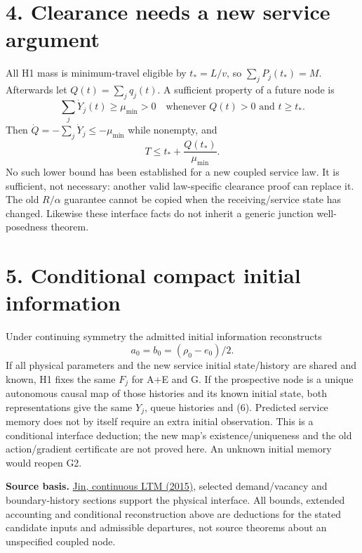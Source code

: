 \documentclass[11pt,a4paper]{article}
\begin{document}
\section*{4. Clearance needs a new service argument}

All H1 mass is minimum-travel eligible by $t_*=L/v$, so $\sum_jP_j(t_*)=M$.
Afterwards let $Q(t)=\sum_jq_j(t)$. A sufficient property of a future node is
\begin{equation}
 \sum_j\dot Y_j(t)\geq\mu_{\min}>0
 \quad\text{whenever }Q(t)>0\text{ and }t\geq t_*.
 \tag{7}
\end{equation}
Then $\dot Q=-\sum_j\dot Y_j\leq-\mu_{\min}$ while nonempty, and
\begin{equation}
 T\leq t_*+\frac{Q(t_*)}{\mu_{\min}}.
 \tag{8}
\end{equation}
No such lower bound has been established for a new coupled service law.
It is sufficient, not necessary: another valid law-specific clearance
proof can replace it. The old $R/\alpha$ guarantee cannot be copied when
the receiving/service state has changed. Likewise these interface facts
do not inherit a generic junction well-posedness theorem.

\section*{5. Conditional compact initial information}

Under continuing symmetry the admitted initial information reconstructs
\begin{equation}
 a_0=b_0=(\rho_0-e_0)/2.
 \tag{9}
\end{equation}
If all physical parameters and the new service initial state/history are
shared and known, H1 fixes the same $F_j$ for A+E and G. If the prospective
node is a unique autonomous causal map of those histories and its known
initial state, both representations give the same $Y_j$, queue histories
and (6). Predicted service memory does not by itself require an extra
initial observation. This is a conditional interface deduction; the new
map's existence/uniqueness and the old action/gradient certificate are
not proved here. An unknown initial memory would reopen G2.

\textbf{Source basis.}
\href{https://arxiv.org/pdf/1405.7080}{Jin, continuous LTM (2015),}
selected demand/vacancy and boundary-history sections support the physical
interface. All bounds, extended accounting and conditional reconstruction
above are deductions for the stated candidate inputs and admissible
departures, not source theorems about an unspecified coupled node.
\end{document}
